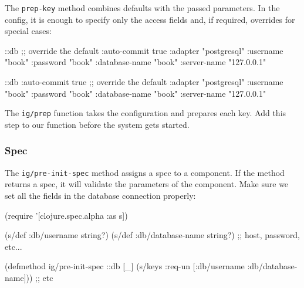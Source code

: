 The \verb|prep-key| method combines defaults with the passed parameters. In the config, it is enough to specify only the access fields and, if required, overrides for special cases:

\ifnarrow

\begin{english}
  \begin{clojure}
{::db {;; override the default
       :auto-commit   true
       :adapter       "postgresql"
       :username      "book"
       :password      "book"
       :database-name "book"
       :server-name   "127.0.0.1"}}
  \end{clojure}
\end{english}

\else

\begin{english}
  \begin{clojure}
{::db {:auto-commit   true ;; override the default
       :adapter       "postgresql"
       :username      "book"
       :password      "book"
       :database-name "book"
       :server-name   "127.0.0.1"}}
  \end{clojure}
\end{english}

\fi

The \verb|ig/prep| function takes the configuration and prepares each key. Add this step to our function  before the system gets started.

\subsubsection{Spec}


The \verb|ig/pre-init-spec| method assigns a spec to a component. If the method returns a spec, it will validate the parameters of the component. Make sure we set all the fields in the database connection properly:

\ifnarrow

\begin{english}
  \begin{clojure}
(require '[clojure.spec.alpha :as s])

(s/def :db/username string?)
(s/def :db/database-name string?)
;; host, password, etc...

(defmethod ig/pre-init-spec ::db [_]
  (s/keys :req-un [:db/username
                   :db/database-name]))
                   ;; etc
  \end{clojure}
\end{english}

